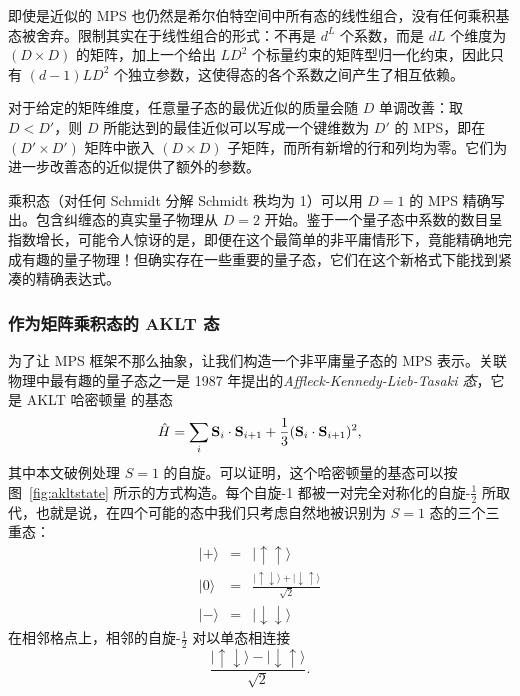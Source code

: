 \documentclass[a4paper,10pt,oneside,onecolumn,1p,times]{elsarticle}
\newcommand{\ham}{\hat{H}}                          %
\newcommand{\ket}[1]{\mbox{$| #1  \rangle$}}
\begin{document}
即使是近似的 MPS 也仍然是希尔伯特空间中所有态的线性组合，没有任何乘积基态被舍弃。限制其实在于线性组合的形式：不再是 $d^L$ 个系数，而是 $dL$ 个维度为 $(D\times D)$ 的矩阵，加上一个给出 $LD^2$ 个标量约束的矩阵型归一化约束，因此只有 $(d-1)LD^2$ 个独立参数，这使得态的各个系数之间产生了相互依赖。
 
对于给定的矩阵维度，任意量子态的最优近似的质量会随 $D$ 单调改善：取 $D<D'$，则 $D$ 所能达到的最佳近似可以写成一个键维数为 $D'$ 的 MPS，即在 $(D' \times D')$ 矩阵中嵌入 $(D \times D)$ 子矩阵，而所有新增的行和列均为零。它们为进一步改善态的近似提供了额外的参数。

乘积态（对任何 Schmidt 分解 Schmidt 秩均为 1）可以用 $D=1$ 的 MPS 精确写出。包含纠缠态的真实量子物理从 $D=2$ 开始。鉴于一个量子态中系数的数目呈指数增长，可能令人惊讶的是，即便在这个最简单的非平庸情形下，竟能精确地完成有趣的量子物理！但确实存在一些重要的量子态，它们在这个新格式下能找到紧凑的精确表达式。

\subsubsection{作为矩阵乘积态的 AKLT 态}
为了让 MPS 框架不那么抽象，让我们构造一个非平庸量子态的 MPS 表示。关联物理中最有趣的量子态之一是 1987 年提出的{\em Affleck-Kennedy-Lieb-Tasaki 态}，它是 AKLT 哈密顿量\cite{Affleck87,Affleck88} 的基态
\begin{equation}
\ham = \sum_{i} {\bf S}_i \cdot {\bf S}_{i+1} + 
\frac{1}{3} ({\bf S}_i \cdot {\bf S}_{i+1})^2 , 
\label{eq:aklt_hamiltonian}
\end{equation}
其中本文破例处理 $S=1$ 的自旋。可以证明，这个哈密顿量的基态可以按图~\ref{fig:akltstate} 所示的方式构造。每个自旋-1 都被一对完全对称化的自旋-$\frac{1}{2}$ 所取代，也就是说，在四个可能的态中我们只考虑自然地被识别为 $S=1$ 态的三个三重态：
\begin{eqnarray}
\ket{+}&=&\ket{\uparrow\uparrow} \nonumber \\
\ket{0}&=&\frac{\ket{\uparrow\downarrow}+\ket{\downarrow\uparrow}}{\sqrt{2}} 
\label{eq:tripletmapping} \\
\ket{-}&=&\ket{\downarrow\downarrow} \nonumber
\end{eqnarray}
在相邻格点上，相邻的自旋-$\frac{1}{2}$ 对以单态相连接
\begin{equation}
\frac{\ket{\uparrow\downarrow}-\ket{\downarrow\uparrow}}{\sqrt{2}} .
\end{equation}
\end{document}
